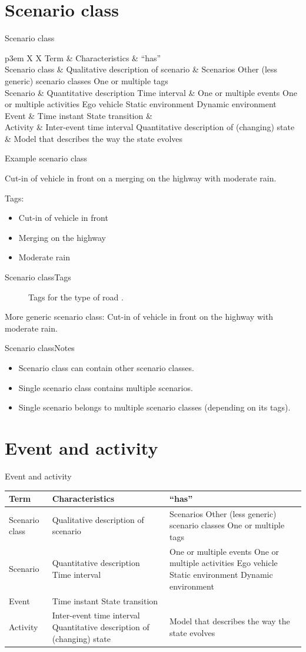 \documentclass[aspectratio=\AspectR,10pt,compress,t]{beamer} %
\newcommand{\otoprule}{\midrule[\heavyrulewidth]}				%
\newcommand{\ontologytable}[1]{%
	\begin{table}
		\begin{center}
			\footnotesize
			\begin{tabularx}{\linewidth}{p{3em} X X}
				\toprule
				Term & Characteristics & ``has'' \\ \otoprule
				\ifthenelse{\equal{#1}{2}}{\leavevmode\color{red}}{} Scenario class & \ifthenelse{\equal{#1}{2}}{\leavevmode\color{red}}{} Qualitative description of scenario & \ifthenelse{\equal{#1}{2}}{\leavevmode\color{red}}{} Scenarios \newline Other (less generic) scenario classes \newline One or multiple tags \\
				\ifthenelse{\equal{#1}{1}}{\leavevmode\color{red}}{} Scenario & \ifthenelse{\equal{#1}{1}}{\leavevmode\color{red}}{} Quantitative description \newline Time interval & \ifthenelse{\equal{#1}{1}}{\leavevmode\color{red}}{} One or multiple events \newline One or multiple activities \newline Ego vehicle \newline Static environment \newline Dynamic environment \\
				\ifthenelse{\equal{#1}{3}}{\leavevmode\color{red}}{} Event & \ifthenelse{\equal{#1}{3}}{\leavevmode\color{red}}{} Time instant \newline State transition & \\
				\ifthenelse{\equal{#1}{3}}{\leavevmode\color{red}}{} Activity & \ifthenelse{\equal{#1}{3}}{\leavevmode\color{red}}{} Inter-event time interval \newline Quantitative description of (changing) state & \ifthenelse{\equal{#1}{3}}{\leavevmode\color{red}}{} Model that describes the way the state evolves \\
				\bottomrule
			\end{tabularx}
		\end{center}
	\end{table}
}
\begin{document}
\section{Scenario class}
\begin{frame}{Scenario class}
	\ontologytable{2}
\end{frame}

\begin{frame}{Example scenario class}
	\begin{example}
		Cut-in of vehicle in front on a merging on the highway with moderate rain.
	\end{example}

	Tags:
	\begin{itemize}
		\item Cut-in of vehicle in front
		\item Merging on the highway
		\item Moderate rain
	\end{itemize}
\end{frame}

\begin{frame}{Scenario class}{Tags}
	\begin{figure}
		\begin{center}
			
			\caption{Tags for the type of road \cite{Bonnin2014}.}
		\end{center}
	\end{figure}

	More generic scenario class: Cut-in of vehicle in front on the highway with moderate rain.
\end{frame}

\begin{frame}{Scenario class}{Notes}
	\begin{itemize}
		\item Scenario class can contain other scenario classes.
		\item Single scenario class contains multiple scenarios.
		\item Single scenario belongs to multiple scenario classes (depending on its tags).
	\end{itemize}
\end{frame}

\section{Event and activity}
\begin{frame}{Event and activity}
	\ontologytable{3}
\end{frame}
\end{document}
